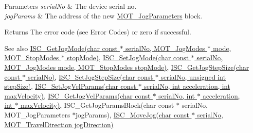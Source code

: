 \begin{DoxyParams}{Parameters}
{\em serial\+No} & The device serial no. \\
\hline
{\em jog\+Params} & The address of the new \hyperlink{struct_m_o_t___jog_parameters}{M\+O\+T\+\_\+\+Jog\+Parameters} block. \\
\hline
\end{DoxyParams}
\begin{DoxyReturn}{Returns}
The error code (see Error Codes) or zero if successful. 
\end{DoxyReturn}
\begin{DoxySeeAlso}{See also}
\hyperlink{group___integrated_stepper_motors_gaab2198da230c8a2c532c644958fd673b}{I\+S\+C\+\_\+\+Get\+Jog\+Mode(char const $\ast$ serial\+No, M\+O\+T\+\_\+\+Jog\+Modes $\ast$ mode, M\+O\+T\+\_\+\+Stop\+Modes $\ast$ stop\+Mode)}, \hyperlink{group___integrated_stepper_motors_ga13d248af45e7b14fd4dde2c2d403e262}{I\+S\+C\+\_\+\+Set\+Jog\+Mode(char const $\ast$ serial\+No, M\+O\+T\+\_\+\+Jog\+Modes mode, M\+O\+T\+\_\+\+Stop\+Modes stop\+Mode)}, \hyperlink{group___integrated_stepper_motors_gaaced0eae4d9e787711102fb2d388c4ac}{I\+S\+C\+\_\+\+Get\+Jog\+Step\+Size(char const $\ast$ serial\+No)}, \hyperlink{group___integrated_stepper_motors_ga3a5ad9b0ffc60c9f7e821b11c7a844b5}{I\+S\+C\+\_\+\+Set\+Jog\+Step\+Size(char const $\ast$ serial\+No, unsigned int step\+Size)}, \hyperlink{group___integrated_stepper_motors_ga43510de1088ba16f4a718cd66ee9368d}{I\+S\+C\+\_\+\+Set\+Jog\+Vel\+Params(char const $\ast$ serial\+No, int acceleration, int max\+Velocity)}, \hyperlink{group___integrated_stepper_motors_ga375530d0ec2239a526f22574da6b6968}{I\+S\+C\+\_\+\+Get\+Jog\+Vel\+Params(char const $\ast$ serial\+No, int $\ast$ acceleration, int $\ast$ max\+Velocity)}, I\+S\+C\+\_\+\+Get\+Jog\+Params\+Block(char const $\ast$ serial\+No, M\+O\+T\+\_\+\+Jog\+Parameters $\ast$jog\+Params), \hyperlink{group___integrated_stepper_motors_gaecadeb580793b1296eba22b3f9ad3927}{I\+S\+C\+\_\+\+Move\+Jog(char const $\ast$ serial\+No, M\+O\+T\+\_\+\+Travel\+Direction jog\+Direction)}


\end{DoxySeeAlso}

\begin{DoxyCodeInclude}
\end{DoxyCodeInclude}
